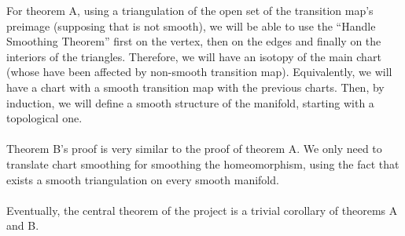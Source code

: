 For theorem A, using a triangulation of the open set of the transition map's preimage (supposing that is not smooth), we will be able to use the ``Handle Smoothing Theorem'' first on the vertex, then on the edges and finally on the interiors of the triangles. Therefore, we will have an isotopy of the main chart (whose have been affected by non-smooth transition map). Equivalently, we will have a chart with a smooth transition map with the previous charts. Then, by induction, we will define a smooth structure of the manifold, starting with a topological one.\\
\\Theorem B's proof is very similar to the proof of theorem A. We only need to translate chart smoothing for smoothing the homeomorphism, using the fact that exists a smooth triangulation on every smooth manifold.\\
\\Eventually, the central theorem of the project is a trivial corollary of theorems A and B.

